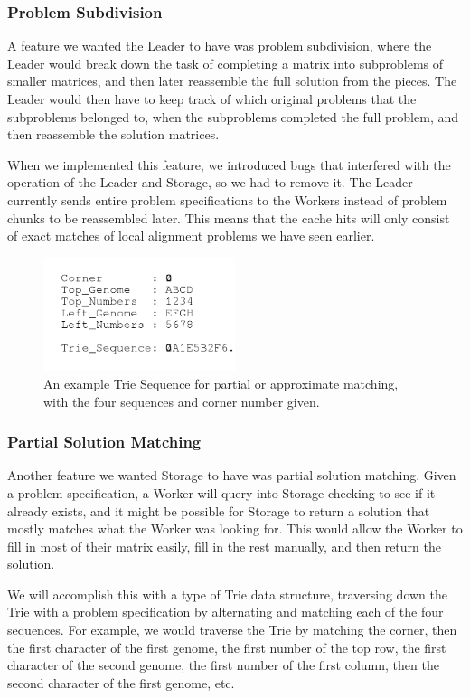 \documentclass[12pt]{article}
\begin{document}
\subsubsection{Problem Subdivision}
A feature we wanted the Leader to have was problem subdivision, where the Leader would break down the task of completing a matrix into subproblems of smaller matrices, and then later reassemble the full solution from the pieces. The Leader would then have to keep track of which original problems that the subproblems belonged to, when the subproblems completed the full problem, and then reassemble the solution matrices.
  
When we implemented this feature, we introduced bugs that interfered with the operation of the Leader and Storage, so we had to remove it. The Leader currently sends entire problem specifications to the Workers instead of problem chunks to be reassembled later. This means that the cache hits will only consist of exact matches of local alignment problems we have seen earlier. 


\begin{figure}
  \centering 
  \includegraphics[width=0.5\textwidth]{trie_corrected}
  \caption{An example Trie Sequence for partial or approximate matching, with the four sequences and corner number given.}
  \label{fig:trie}
\end{figure}


\subsubsection{Partial Solution Matching}

Another feature we wanted Storage to have was partial solution matching. Given a problem specification, a Worker will query into Storage checking to see if it already exists, and it might be possible for Storage to return a solution that mostly matches what the Worker was looking for. This would allow the Worker to fill in most of their matrix easily, fill in the rest manually, and then return the solution.

We will accomplish this with a type of Trie data structure, traversing down the Trie with a problem specification by alternating and matching each of the four sequences. For example, we would traverse the Trie by matching the corner, then the first character of the first genome, the first number of the top row, the first character of the second genome, the first number of the first column, then the second character of the first genome, etc. 
\end{document}
